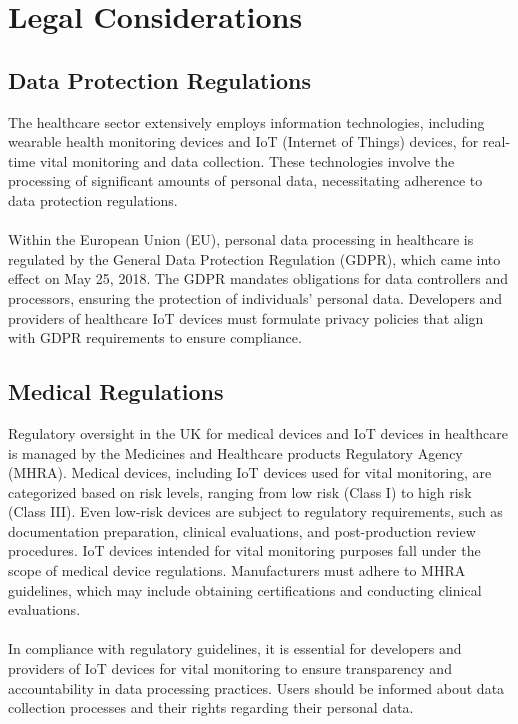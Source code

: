 \chapter{Legal Considerations}

\section{Data Protection Regulations}

The healthcare sector extensively employs information technologies, including wearable health monitoring devices and IoT (Internet of Things) devices, for real-time vital monitoring and data collection. These technologies involve the processing of significant amounts of personal data, necessitating adherence to data protection regulations. \\ \\
Within the European Union (EU), personal data processing in healthcare is regulated by the General Data Protection Regulation (GDPR), which came into effect on May 25, 2018. The GDPR mandates obligations for data controllers and processors, ensuring the protection of individuals' personal data. Developers and providers of healthcare IoT devices must formulate privacy policies that align with GDPR requirements to ensure compliance.

\section{Medical Regulations}

Regulatory oversight in the UK for medical devices and IoT devices in healthcare is managed by the Medicines and Healthcare products Regulatory Agency (MHRA). Medical devices, including IoT devices used for vital monitoring, are categorized based on risk levels, ranging from low risk (Class I) to high risk (Class III). Even low-risk devices are subject to regulatory requirements, such as documentation preparation, clinical evaluations, and post-production review procedures. IoT devices intended for vital monitoring purposes fall under the scope of medical device regulations. Manufacturers must adhere to MHRA guidelines, which may include obtaining certifications and conducting clinical evaluations. \\ \\
In compliance with regulatory guidelines, it is essential for developers and providers of IoT devices for vital monitoring to ensure transparency and accountability in data processing practices. Users should be informed about data collection processes and their rights regarding their personal data.

